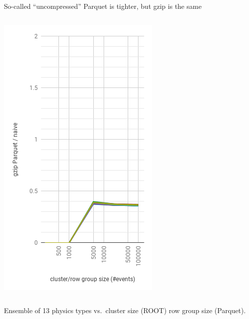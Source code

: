 \documentclass[aspectratio=169]{beamer}
\begin{document}
\begin{frame}{So-called ``uncompressed'' Parquet is tighter, but gzip is the same}
\begin{columns}
\begin{center}
\includegraphics[width=\linewidth]{parquet-gzip.png}
\end{center}
\end{columns}

\vspace{0.25 cm}
Ensemble of 13 physics types vs.\ cluster size (ROOT) row group size (Parquet).
\end{frame}
\end{document}
